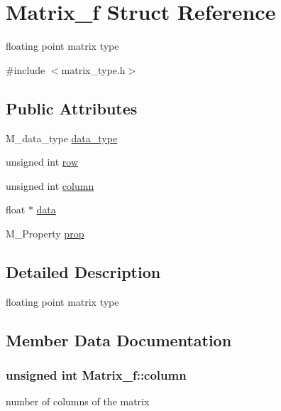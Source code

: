 \hypertarget{structMatrix__f}{}\section{Matrix\+\_\+f Struct Reference}
\label{structMatrix__f}


floating point matrix type  




{\ttfamily \#include $<$matrix\+\_\+type.\+h$>$}

\subsection*{Public Attributes}
\begin{DoxyCompactItemize}
\item 
M\+\_\+data\+\_\+type \hyperlink{structMatrix__f_a208178d3dfeaa5adab42b96aff8c97d5}{data\+\_\+type}
\item 
unsigned int \hyperlink{structMatrix__f_a1105833a934acf7f2a07b154c1733acf}{row}
\item 
unsigned int \hyperlink{structMatrix__f_a2dff146309a2461f46463286f2b99ffc}{column}
\item 
float $\ast$ \hyperlink{structMatrix__f_aad17369cd1b7acebc55379d862e821c2}{data}
\item 
M\+\_\+\+Property \hyperlink{structMatrix__f_a0f8b87b8012ab2ffa92fbe55b1009d71}{prop}
\end{DoxyCompactItemize}


\subsection{Detailed Description}
floating point matrix type 

\subsection{Member Data Documentation}
\subsubsection[{\texorpdfstring{column}{column}}]{\setlength{\rightskip}{0pt plus 5cm}unsigned int Matrix\+\_\+f\+::column}\hypertarget{structMatrix__f_a2dff146309a2461f46463286f2b99ffc}{}\label{structMatrix__f_a2dff146309a2461f46463286f2b99ffc}
number of columns of the matrix 
